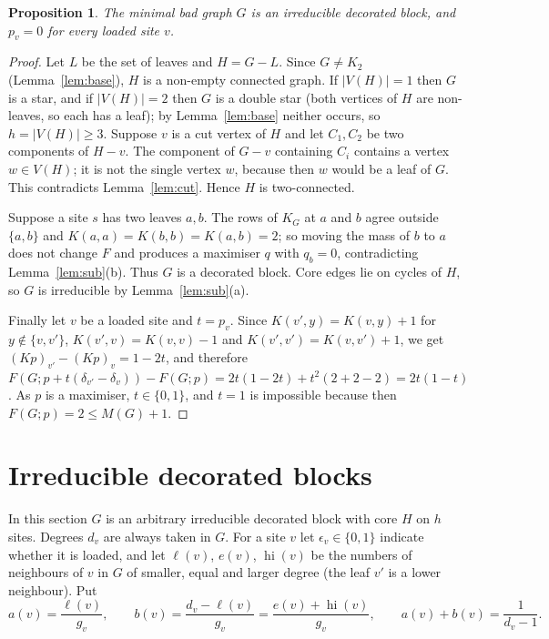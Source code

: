 \documentclass[11pt,a4paper]{article}
\newtheorem{proposition}[theorem]{Proposition}
\theoremstyle{definition}
\theoremstyle{remark}
\numberwithin{equation}{section}
\newcommand{\hi}{\operatorname{hi}}
\begin{document}
\begin{proposition}\label{prop:shape}
The minimal bad graph $G$ is an irreducible decorated block, and $p_v=0$ for every
loaded site $v$.
\end{proposition}
\begin{proof}
Let $L$ be the set of leaves and $H=G-L$. Since $G\ne K_2$ (Lemma~\ref{lem:base}),
$H$ is a non-empty connected graph. If $|V(H)|=1$ then $G$ is a star, and if $|V(H)|=2$ then $G$ is a double star (both vertices of $H$ are
non-leaves, so each has a leaf); by Lemma~\ref{lem:base} neither occurs, so
$h=|V(H)|\ge3$. Suppose $v$ is a cut vertex of $H$ and let $C_1,C_2$ be two
components of $H-v$. The component of $G-v$ containing $C_i$ contains a vertex
$w\in V(H)$; it is not the single vertex $w$, because then $w$ would be a leaf of
$G$. This contradicts Lemma~\ref{lem:cut}. Hence $H$ is two-connected.

Suppose a site $s$ has two leaves $a,b$. The rows of $K_G$ at $a$ and $b$ agree
outside $\{a,b\}$ and $K(a,a)=K(b,b)=K(a,b)=2$; so moving the mass of $b$ to $a$
does not change $F$ and produces a maximiser $q$ with $q_b=0$, contradicting
Lemma~\ref{lem:sub}(b). Thus $G$ is a decorated block. Core edges lie on cycles of
$H$, so $G$ is irreducible by Lemma~\ref{lem:sub}(a).

Finally let $v$ be a loaded site and $t=p_v$. Since $K(v',y)=K(v,y)+1$ for
$y\notin\{v,v'\}$, $K(v',v)=K(v,v)-1$ and $K(v',v')=K(v,v')+1$, we get
$(Kp)_{v'}-(Kp)_v=1-2t$, and therefore
$F(G;p+t(\delta_{v'}-\delta_v))-F(G;p)=2t(1-2t)+t^2(2+2-2)=2t(1-t)$. As $p$ is a
maximiser, $t\in\{0,1\}$, and $t=1$ is impossible because then $F(G;p)=2\le M(G)+1$.
\end{proof}

\section{Irreducible decorated blocks}\label{sec:blocks}

In this section $G$ is an arbitrary irreducible decorated block with core $H$ on
$h$ sites. Degrees $d_v$ are always taken in $G$. For a site $v$ let $\epsilon_v\in\{0,1\}$
indicate whether it is loaded, and let $\ell(v)$, $e(v)$, $\hi(v)$ be the numbers of
neighbours of $v$ in $G$ of smaller, equal and larger degree (the leaf $v'$ is a
lower neighbour). Put
\[
 a(v)=\frac{\ell(v)}{g_v},\qquad b(v)=\frac{d_v-\ell(v)}{g_v}=\frac{e(v)+\hi(v)}{g_v},
 \qquad a(v)+b(v)=\frac1{d_v-1}.
\]
\end{document}
